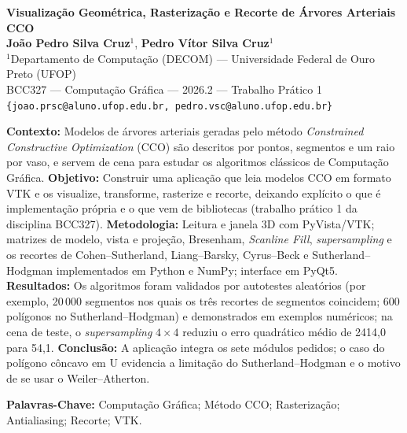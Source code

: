 \documentclass[11pt, a4paper]{article}
\begin{document}
\begin{center}
  {\LARGE \bfseries \textcolor{ufopred}{Visualização Geométrica, Rasterização e Recorte de Árvores Arteriais CCO}}\\[0.4cm]
  {\large \textbf{João Pedro Silva Cruz}$^{1}$, \textbf{Pedro Vítor Silva Cruz}$^{1}$}\\[0.2cm]
  {\small $^{1}$Departamento de Computação (DECOM) --- Universidade Federal de Ouro Preto (UFOP)\\[0.1cm]
  BCC327 --- Computação Gráfica --- 2026.2 --- Trabalho Prático 1\\[0.1cm]
  \texttt{\{joao.prsc@aluno.ufop.edu.br, pedro.vsc@aluno.ufop.edu.br\}}}\\[0.4cm]
\end{center}

\begin{tcolorbox}[colback=lightgray, colframe=deepnavy, arc=3pt, title=\textbf{RESUMO}, fonttitle=\bfseries]
\small
\textbf{Contexto:} Modelos de árvores arteriais geradas pelo método \emph{Constrained Constructive Optimization} (CCO) são descritos por pontos, segmentos e um raio por vaso, e servem de cena para estudar os algoritmos clássicos de Computação Gráfica.
\textbf{Objetivo:} Construir uma aplicação que leia modelos CCO em formato VTK e os visualize, transforme, rasterize e recorte, deixando explícito o que é implementação própria e o que vem de bibliotecas (trabalho prático 1 da disciplina BCC327).
\textbf{Metodologia:} Leitura e janela 3D com PyVista/VTK; matrizes de modelo, vista e projeção, Bresenham, \emph{Scanline Fill}, \emph{supersampling} e os recortes de Cohen--Sutherland, Liang--Barsky, Cyrus--Beck e Sutherland--Hodgman implementados em Python e NumPy; interface em PyQt5.
\textbf{Resultados:} Os algoritmos foram validados por autotestes aleatórios (por exemplo, 20\,000 segmentos nos quais os três recortes de segmentos coincidem; 600 polígonos no Sutherland--Hodgman) e demonstrados em exemplos numéricos; na cena de teste, o \emph{supersampling} $4\times4$ reduziu o erro quadrático médio de 2414,0 para 54,1.
\textbf{Conclusão:} A aplicação integra os sete módulos pedidos; o caso do polígono côncavo em U evidencia a limitação do Sutherland--Hodgman e o motivo de se usar o Weiler--Atherton.

\vspace{0.2cm}
\textbf{Palavras-Chave:} Computação Gráfica; Método CCO; Rasterização; Antialiasing; Recorte; VTK.
\end{tcolorbox}
\end{document}
